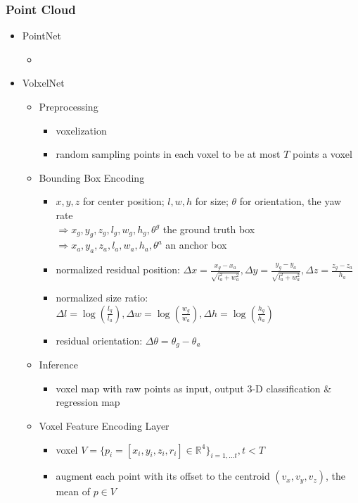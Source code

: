 \subsubsection{Point Cloud}
\begin{itemize}
\item PointNet
	\begin{itemize}
	\item 
	\end{itemize}
\item VolxelNet
	\begin{itemize}
	\item Preprocessing
		\begin{itemize}
		\item voxelization
		\item random sampling points in each voxel to be at most $T$ points a voxel
		\end{itemize}
	\item Bounding Box Encoding
		\begin{itemize}
		\item $x,y,z$ for center position; $l,w,h$ for size; $\theta$ for orientation, the yaw rate \\
		$\Rightarrow x_g,y_g,z_g,l_g,w_g,h_g,\theta^g$ the ground truth box \\
		$\Rightarrow x_a,y_a,z_a,l_a,w_a,h_a,\theta^a$ an anchor box
		\item normalized residual position: $\Delta x=\frac{x_g-x_a}{\sqrt{l_a^2+w_a^2}}, \Delta y=\frac{y_g-y_a} {\sqrt{l_a^2+w_a^2}}, \Delta z=\frac{z_g-z_a}{h_a}$
		\item normalized size ratio: $\Delta l=\log(\frac {l_g}{l_a}), \Delta w = \log(\frac{w_g}{w_a}), \Delta h=\log(\frac{h_g}{h_a})$
		\item residual orientation: $\Delta \theta = \theta_g - \theta_a$
		\end{itemize}
	\item Inference
		\begin{itemize}
		\item voxel map with raw points as input, output $3$-D classification \& regression map
		\end{itemize}
	\item Voxel Feature Encoding Layer
		\begin{itemize}
		\item voxel $V=\{p_i=[x_i,y_i,z_i,r_i]\in \mathbb R^4 \}_{i=1,...t}, t<T$
		\item augment each point with its offset to the centroid $(v_x,v_y,v_z)$, the mean of $p\in V$ \\

\end{itemize}
\end{itemize}
\end{itemize}
